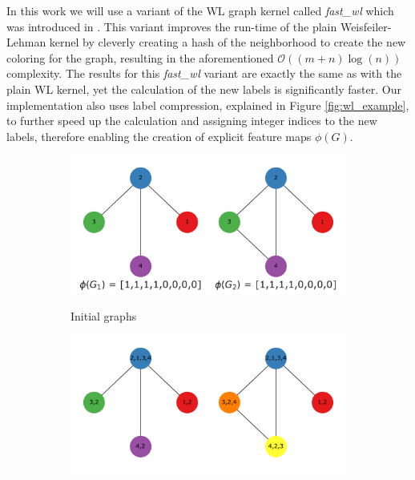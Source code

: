 In this work we will use a variant of the WL graph kernel called \textit{fast\_wl} which was introduced in \cite{Kersting2013}.
This variant improves the run-time of the plain Weisfeiler-Lehman kernel by cleverly creating a hash of the neighborhood to create the new coloring for the graph, resulting in the aforementioned $\mathcal{O}((m + n) \log(n))$ complexity.
The results for this \textit{fast\_wl} variant are exactly the same as with the plain WL kernel, yet the calculation of the new labels is significantly faster.
Our implementation also uses label compression, explained in Figure \ref{fig:wl_example}, to further speed up the calculation and assigning integer indices to the new labels, therefore enabling the creation of explicit feature maps $\phi(G)$.

\begin{figure}[htb!]
  \centering
  \begin{subfigure}[t]{0.49\linewidth}
  {\includegraphics[width=\linewidth]{assets/figures/wl_examples/wl_iteration_0.pdf}\label{fig:wl_example_0}}
  \caption{Initial graphs}
  \end{subfigure}
  \begin{subfigure}[t]{0.49\linewidth}
  {\includegraphics[width=\linewidth]{assets/figures/wl_examples/wl_iteration_1_stage_0_recolored}}

\end{subfigure}
\end{figure}
